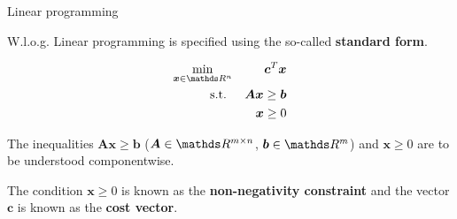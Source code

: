 \begin{vbframe}{Linear programming}















\framebreak

W.l.o.g. Linear programming is specified using the so-called \textbf{standard form}.

\vspace*{-0.5cm}

\begin{eqnarray*}
\min_{\bm{x} \in \R^n} && \bm{c}^T\bm{x}\\
\text{s.t. } && \bm{A}\bm{x} \ge \bm{b} \\
&& \bm{x} \ge 0
\end{eqnarray*}

The inequalities $\bm{Ax} \ge \bm{b}$ ($\bm{A} \in \R^{m\times n}$, $\bm{b} \in \R^m$) and $\bm{x} \ge 0$ are to be understood componentwise.

\lz

The condition $\bm{x} \ge 0$ is known as the \textbf{non-negativity constraint} and the vector $\bm{c}$ is known as the \textbf{cost vector}.

%
%


\end{vbframe}
